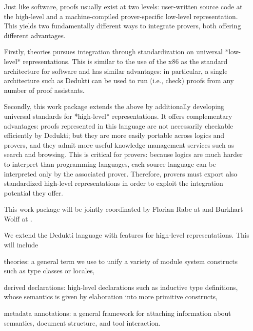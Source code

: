 \begin{workpackage}[id=structuring,wphases=0-48,type=RTD,
  short=Structured Theories and Metadata,%
  title=Structured Theories and Metadata,
  lead=FAU,
  BolRM=18,
  FAURM=48,
  SacRM=48]
  

\begin{wpobjectives}
Just like software, proofs usually exist at two levels: user-written source code at the high-level and a machine-compiled prover-specific low-level representation.
This yields two fundamentally different ways to integrate provers, both offering different advantages.

Firstly, theories pursues integration through standardization on universal *low-level* representations.
This is similar to the use of the x86 as the standard architecture for software and has similar advantages: in particular, a single architecture such as Dedukti can be used to run (i.e., check) proofs from any number of proof assistants.

Secondly, this work package extends the above by additionally developing universal standards for *high-level* representations.
It offers complementary advantages: proofs represented in this language are not necessarily checkable efficiently by Dedukti; but they are more easily portable across logics and provers, and they admit more useful knowledge management services such as search and browsing.
This is critical for provers: because logics are much harder to interpret than programming languages, each source language can be interpreted only by the associated prover.
Therefore, provers must export also standardized high-level representations in order to exploit the integration potential they offer.

This work package will be jointly coordinated by Florian Rabe at  and Burkhart Wolff at .
\end{wpobjectives}


\begin{wpdescription}
We extend the Dedukti language with features for high-level representations.
This will include
\begin{compactitem}
\item theories: a general term we use to unify a variety of module system constructs such as type classes or locales,
\item derived declarations: high-level declarations such as inductive type definitions, whose semantics is given by elaboration into more primitive constructs,
\item metadata annotations: a general framework for attaching information about semantics, document structure, and tool interaction.
\end{compactitem}


\end{wpdescription}
\end{workpackage}
